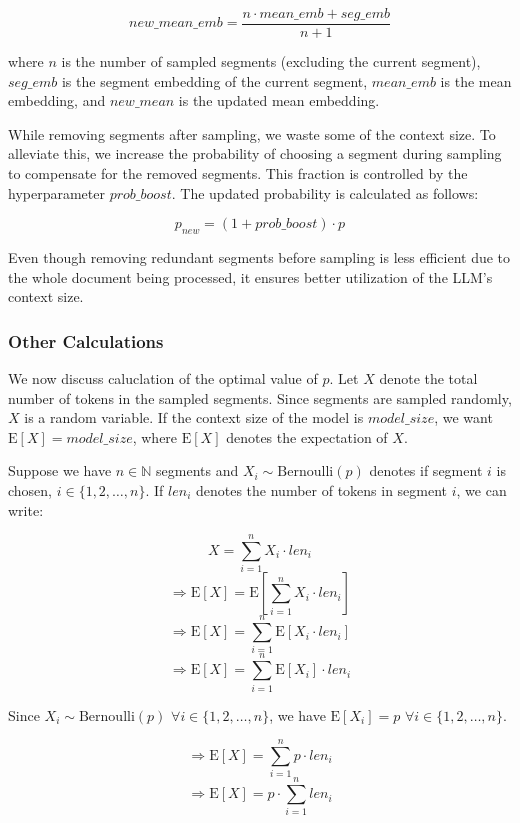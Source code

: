 			\[ new\_mean\_emb = \frac{n \cdot mean\_emb + seg\_emb}{n + 1} \]

			\noindent where $n$ is the number of sampled segments (excluding the current segment),
			$seg\_emb$ is the segment embedding of the current segment, $mean\_emb$ is the mean embedding,
			and $new\_mean$ is the updated mean embedding.

			While removing segments after sampling, we waste some of the context size.
			To alleviate this, we increase the probability of choosing a segment during sampling to
			compensate for the removed segments.
			This fraction is controlled by the hyperparameter $prob\_boost$.
			The updated probability is calculated as follows:
			
			\[ p_{new} = (1 + prob\_boost) \cdot p \]

			Even though removing redundant segments before sampling is less efficient due to the whole
			document being processed, it ensures better utilization of the LLM's context size.

		\subsubsection*{Other Calculations}
		
			We now discuss caluclation of the optimal value of $p$.
			Let $X$ denote the total number of tokens in the sampled segments.
			Since segments are sampled randomly, $X$ is a random variable.
			If the context size of the model is $model\_size$, we want $\mathrm{E}[X] = model\_size$,
			where $\mathrm{E}[X]$ denotes the expectation of $X$.

			Suppose we have $n \in \mathbb{N}$ segments and $X_i \sim \mathrm{Bernoulli}(p)$ denotes
			if segment $i$ is chosen, $i \in \{1, 2, \dots, n\}$.
			If $len_i$ denotes the number of tokens in segment $i$, we can write:

			\[ X = \sum_{i = 1}^{n} X_i \cdot len_i \]
			\[ \Rightarrow \mathrm{E}[X] = \mathrm{E}[\sum_{i = 1}^{n} X_i \cdot len_i] \]
			\[ \Rightarrow \mathrm{E}[X] = \sum_{i = 1}^{n} \mathrm{E}[X_i \cdot len_i] \]
			\[ \Rightarrow \mathrm{E}[X] = \sum_{i = 1}^{n} \mathrm{E}[X_i] \cdot len_i \]

			Since $X_i \sim \mathrm{Bernoulli}(p)$ $\forall i \in \{1, 2, \dots, n\}$, we
			have $\mathrm{E}[X_i] = p$ $\forall i \in \{1, 2, \dots, n\}$.

			\[ \Rightarrow \mathrm{E}[X] = \sum_{i = 1}^{n} p \cdot len_i \]
			\[ \Rightarrow \mathrm{E}[X] = p \cdot \sum_{i = 1}^{n} len_i \]

